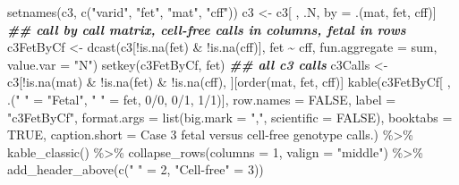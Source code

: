 \documentclass[11pt,letterpaper,oneside]{book}
\newenvironment{Shaded}{\begin{snugshade}}{\end{snugshade}}
\newcommand{\AttributeTok}[1]{\textcolor[rgb]{0.77,0.63,0.00}{#1}}
\newcommand{\ConstantTok}[1]{\textcolor[rgb]{0.00,0.00,0.00}{#1}}
\newcommand{\DecValTok}[1]{\textcolor[rgb]{0.00,0.00,0.81}{#1}}
\newcommand{\DocumentationTok}[1]{\textcolor[rgb]{0.56,0.35,0.01}{\textbf{\textit{#1}}}}
\newcommand{\FunctionTok}[1]{\textcolor[rgb]{0.00,0.00,0.00}{#1}}
\newcommand{\NormalTok}[1]{#1}
\newcommand{\OtherTok}[1]{\textcolor[rgb]{0.56,0.35,0.01}{#1}}
\newcommand{\SpecialCharTok}[1]{\textcolor[rgb]{0.00,0.00,0.00}{#1}}
\newcommand{\StringTok}[1]{\textcolor[rgb]{0.31,0.60,0.02}{#1}}
\begin{document}
\begin{Shaded}
\begin{Highlighting}[]
\FunctionTok{setnames}\NormalTok{(c3, }\FunctionTok{c}\NormalTok{(}\StringTok{"varid"}\NormalTok{, }\StringTok{"fet"}\NormalTok{, }\StringTok{"mat"}\NormalTok{, }\StringTok{"cff"}\NormalTok{))}
\NormalTok{c3 }\OtherTok{\textless{}{-}}\NormalTok{ c3[ , .N, by }\OtherTok{=}\NormalTok{ .(mat, fet, cff)]}
\DocumentationTok{\#\# call by call matrix, cell{-}free calls in columns, fetal in rows}
\NormalTok{c3FetByCf }\OtherTok{\textless{}{-}} \FunctionTok{dcast}\NormalTok{(c3[}\SpecialCharTok{!}\FunctionTok{is.na}\NormalTok{(fet) }\SpecialCharTok{\&} \SpecialCharTok{!}\FunctionTok{is.na}\NormalTok{(cff)], }
\NormalTok{                   fet }\SpecialCharTok{\textasciitilde{}}\NormalTok{ cff,}
                   \AttributeTok{fun.aggregate =}\NormalTok{ sum, }
                   \AttributeTok{value.var =} \StringTok{"N"}\NormalTok{)}
\FunctionTok{setkey}\NormalTok{(c3FetByCf, fet)}
\DocumentationTok{\#\# all c3 calls}
\NormalTok{c3Calls }\OtherTok{\textless{}{-}}\NormalTok{ c3[}\SpecialCharTok{!}\FunctionTok{is.na}\NormalTok{(mat) }\SpecialCharTok{\&} \SpecialCharTok{!}\FunctionTok{is.na}\NormalTok{(fet) }\SpecialCharTok{\&} \SpecialCharTok{!}\FunctionTok{is.na}\NormalTok{(cff), ][}\FunctionTok{order}\NormalTok{(mat, fet, cff)]}
\FunctionTok{kable}\NormalTok{(c3FetByCf[ , .(}\StringTok{" "} \OtherTok{=} \StringTok{"Fetal"}\NormalTok{, }\StringTok{" "} \OtherTok{=}\NormalTok{ fet, }\StringTok{\textasciigrave{}}\AttributeTok{0/0}\StringTok{\textasciigrave{}}\NormalTok{, }\StringTok{\textasciigrave{}}\AttributeTok{0/1}\StringTok{\textasciigrave{}}\NormalTok{, }\StringTok{\textasciigrave{}}\AttributeTok{1/1}\StringTok{\textasciigrave{}}\NormalTok{)], }
      \AttributeTok{row.names =} \ConstantTok{FALSE}\NormalTok{,}
      \AttributeTok{label =} \StringTok{"c3FetByCf"}\NormalTok{,}
      \AttributeTok{format.args =} \FunctionTok{list}\NormalTok{(}\AttributeTok{big.mark =} \StringTok{","}\NormalTok{, }\AttributeTok{scientific =} \ConstantTok{FALSE}\NormalTok{),}
      \AttributeTok{booktabs =} \ConstantTok{TRUE}\NormalTok{,}
      \AttributeTok{caption.short =} \StringTok{\textquotesingle{}Case 3 fetal versus cell-free genotype calls.\textquotesingle{}}\NormalTok{) }\SpecialCharTok{\%\textgreater{}\%}
  \FunctionTok{kable\_classic}\NormalTok{() }\SpecialCharTok{\%\textgreater{}\%}
  \FunctionTok{collapse\_rows}\NormalTok{(}\AttributeTok{columns =} \DecValTok{1}\NormalTok{, }\AttributeTok{valign =} \StringTok{"middle"}\NormalTok{) }\SpecialCharTok{\%\textgreater{}\%}
  \FunctionTok{add\_header\_above}\NormalTok{(}\FunctionTok{c}\NormalTok{(}\StringTok{" "} \OtherTok{=} \DecValTok{2}\NormalTok{, }\StringTok{"Cell{-}free"} \OtherTok{=} \DecValTok{3}\NormalTok{))}

\end{Highlighting}
\end{Shaded}
\end{document}
